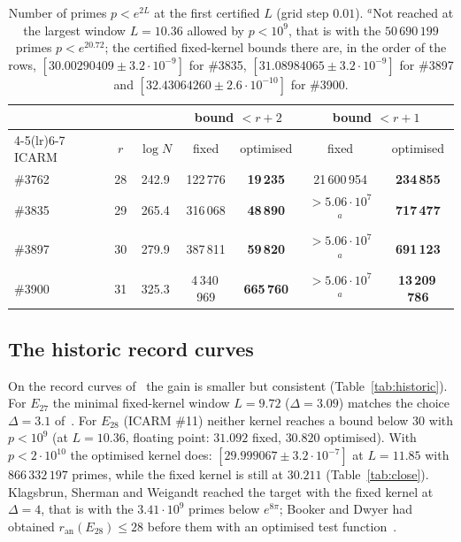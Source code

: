 \documentclass[11pt]{amsart}
\theoremstyle{remark}
\theoremstyle{definition}
\newcommand{\ran}{r_{\mathrm{an}}}
\begin{document}
\begin{table}[h]
\centering\small
\begin{tabular}{lcccccc}
\toprule
 & & & \multicolumn{2}{c}{bound $<r+2$} & \multicolumn{2}{c}{bound $<r+1$}\\
\cmidrule(lr){4-5}\cmidrule(lr){6-7}
ICARM & $r$ & $\log N$ & fixed & optimised & fixed & optimised\\
\midrule
\#3762 & 28 & 242.9 & 122\,776 & \textbf{19\,235} & 21\,600\,954 & \textbf{234\,855}\\
\#3835 & 29 & 265.4 & 316\,068 & \textbf{48\,890} & $>5.06\cdot10^7$ $^{a}$ & \textbf{717\,477}\\
\#3897 & 30 & 279.9 & 387\,811 & \textbf{59\,820} & $>5.06\cdot10^7$ $^{a}$ & \textbf{691\,123}\\
\#3900 & 31 & 325.3 & 4\,340\,969 & \textbf{665\,760} & $>5.06\cdot10^7$ $^{a}$ & \textbf{13\,209\,786}\\
\bottomrule
\end{tabular}
\caption{Number of primes $p<e^{2L}$ at the first certified $L$ (grid step $0.01$). $^{a}$Not reached at the largest window $L=10.36$ allowed by $p<10^9$, that is with the $50\,690\,199$ primes $p<e^{20.72}$; the certified fixed-kernel bounds there are, in the order of the rows, $[30.00290409\pm3.2\cdot10^{-9}]$ for \#3835, $[31.08984065\pm3.2\cdot10^{-9}]$ for \#3897 and $[32.43064260\pm2.6\cdot10^{-10}]$ for \#3900.}
\label{tab:icarm}
\end{table}

\subsection*{The historic record curves}
On the record curves of~\cite{Bober,KSW} the gain is smaller but consistent (Table~\ref{tab:historic}). For $E_{27}$ the minimal fixed-kernel window $L=9.72$ ($\Delta=3.09$) matches the choice $\Delta=3.1$ of~\cite{KSW}. For $E_{28}$ (ICARM \#11) neither kernel reaches a bound below $30$ with $p<10^9$ (at $L=10.36$, floating point: $31.092$ fixed, $30.820$ optimised). With $p<2\cdot10^{10}$ the optimised kernel does: $[29.999067\pm3.2\cdot10^{-7}]$ at $L=11.85$ with $866\,332\,197$ primes, while the fixed kernel is still at $30.211$ (Table~\ref{tab:close}). Klagsbrun, Sherman and Weigandt reached the target with the fixed kernel at $\Delta=4$, that is with the $3.41\cdot10^9$ primes below $e^{8\pi}$; Booker and Dwyer had obtained $\ran(E_{28})\le28$ before them with an optimised test function~\cite[Remark~1.2]{Bober}.
\end{document}
